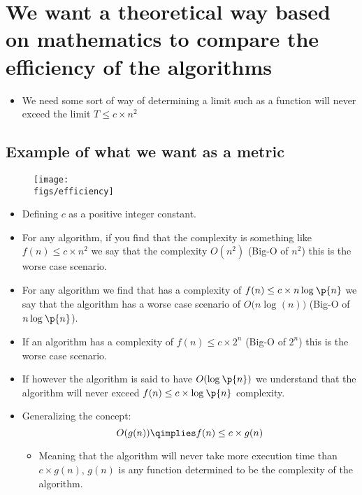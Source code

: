 \section{We want a theoretical way based on mathematics to compare the efficiency of the algorithms}
\begin{itemize}
    \item We need some sort of way of determining a limit such as a function will never exceed the limit $T \leq c \times n^2$ 
\end{itemize}

\subsection{Example of what we want as a metric}
\begin{figure}[H]
    \centering
    \texttt{[image: \\figs/efficiency]} 
\end{figure}

\begin{itemize}
    \item Defining $c$ as a positive integer constant.
    \item For any algorithm, if you find that the complexity is something like $f(n)\leq c\times n^2$ we say that the complexity $O(n^2)$ (Big-O of $n^2$) this is the worse case scenario.
    \item For any algorithm we find that has a complexity of $f(n)\leq c\times n \log_{}\p{ n } $ we say that the algorithm has a worse case scenario of $O(n\log_{}{(n))}$ (Big-O of $n\log_{}\p{ n } $). 
    \item If an algorithm has a complexity of $f(n)\leq c \times 2^n$ (Big-O of $2^n$) this is the worse case scenario.
    \item If however the algorithm is said to have $O(\log_{}\p{ n })$ we understand that the algorithm will never exceed $f(n) \leq c \times \log_{}\p{ n }$ complexity.
    \item Generalizing the concept:  
        \[
            O(g(n)) \qimplies f(n) \leq c \times g(n)
        \]
        \begin{itemize}
            \item Meaning that the algorithm will never take more execution time than $c \times g(n)$, $g(n)$ is any function determined to be the complexity of the algorithm. 
        \end{itemize}
\end{itemize}

